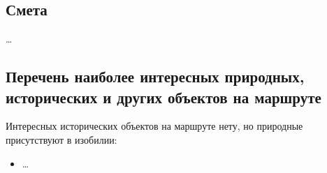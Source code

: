 	
	\subsection{Смета}
		\dots		


	\subsection{Перечень наиболее интересных природных, исторических и других объектов на маршруте}
		Интересных исторических объектов на маршруте нету, но природные присутствуют в изобилии:
		\begin{itemize}
			\item \dots
		\end{itemize}
		
